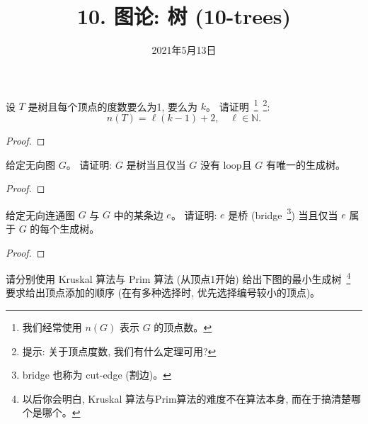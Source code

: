 \documentclass[a4paper, justified]{tufte-handout}
\title{10. 图论: 树 (10-trees)}
\date{2021年5月13日}
\begin{document}
\maketitle
\noplagiarism %
\begin{abstract}
\end{abstract}
\beginrequired

\begin{problem}
  设 $T$ 是树且每个顶点的度数要么为1, 要么为 $k$。
  请证明~\footnote{我们经常使用 $n(G)$ 表示 $G$ 的顶点数。}~\footnote{提示:
  关于顶点度数, 我们有什么定理可用?}:
  \[
    n(T) = \ell (k-1) + 2, \quad\ell \in \mathbb{N}.
  \]
\end{problem}

\begin{proof}
\end{proof}

\begin{problem}
  给定无向图 $G$。
  请证明: $G$ 是树当且仅当 $G$ 没有 loop且 $G$ 有唯一的生成树。
\end{problem}

\begin{proof}
\end{proof}

\begin{problem}
  给定无向连通图 $G$ 与 $G$ 中的某条边 $e$。
  请证明: $e$ 是桥 (bridge~\footnote{bridge 也称为 cut-edge (割边)。})
    当且仅当 $e$ 属于 $G$ 的每个生成树。
\end{problem}

\begin{proof}
\end{proof}

\begin{problem}[\score{4 = 2 + 2} $\star\star$]
  请分别使用 Kruskal 算法与 Prim 算法 (从顶点1开始)
  给出下图的最小生成树~\footnote{以后你会明白, Kruskal
  算法与Prim算法的难度不在算法本身, 而在于搞清楚哪个是哪个。}
  要求给出顶点添加的顺序 (在有多种选择时, 优先选择编号较小的顶点)。

\end{problem}
\end{document}
